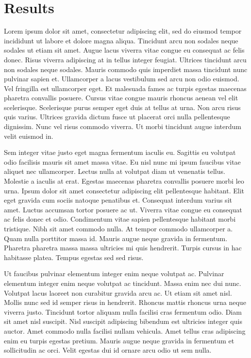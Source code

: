 \documentclass[
]{article}
\begin{document}
\hypertarget{results}{%
\section{Results}\label{results}}

Lorem ipsum dolor sit amet, consectetur adipiscing elit, sed do eiusmod tempor incididunt ut labore et dolore magna aliqua. Tincidunt arcu non sodales neque sodales ut etiam sit amet. Augue lacus viverra vitae congue eu consequat ac felis donec. Risus viverra adipiscing at in tellus integer feugiat. Ultrices tincidunt arcu non sodales neque sodales. Mauris commodo quis imperdiet massa tincidunt nunc pulvinar sapien et. Ullamcorper a lacus vestibulum sed arcu non odio euismod. Vel fringilla est ullamcorper eget. Et malesuada fames ac turpis egestas maecenas pharetra convallis posuere. Cursus vitae congue mauris rhoncus aenean vel elit scelerisque. Scelerisque purus semper eget duis at tellus at urna. Non arcu risus quis varius. Ultrices gravida dictum fusce ut placerat orci nulla pellentesque dignissim. Nunc vel risus commodo viverra. Ut morbi tincidunt augue interdum velit euismod in.

Sem integer vitae justo eget magna fermentum iaculis eu. Sagittis eu volutpat odio facilisis mauris sit amet massa vitae. Eu nisl nunc mi ipsum faucibus vitae aliquet nec ullamcorper. Lectus nulla at volutpat diam ut venenatis tellus. Molestie a iaculis at erat. Egestas maecenas pharetra convallis posuere morbi leo urna. Ipsum dolor sit amet consectetur adipiscing elit pellentesque habitant. Elit eget gravida cum sociis natoque penatibus et. Consequat interdum varius sit amet. Luctus accumsan tortor posuere ac ut. Viverra vitae congue eu consequat ac felis donec et odio. Condimentum vitae sapien pellentesque habitant morbi tristique. Nibh sit amet commodo nulla. At tempor commodo ullamcorper a. Quam nulla porttitor massa id. Mauris augue neque gravida in fermentum. Pharetra pharetra massa massa ultricies mi quis hendrerit. Turpis cursus in hac habitasse platea. Tempus egestas sed sed risus.

Ut faucibus pulvinar elementum integer enim neque volutpat ac. Pulvinar elementum integer enim neque volutpat ac tincidunt. Massa enim nec dui nunc. Volutpat lacus laoreet non curabitur gravida arcu ac. Ut etiam sit amet nisl. Mollis nunc sed id semper risus in hendrerit. Rhoncus mattis rhoncus urna neque viverra justo. Tincidunt tortor aliquam nulla facilisi cras fermentum odio. Diam sit amet nisl suscipit. Nisl suscipit adipiscing bibendum est ultricies integer quis auctor. Amet commodo nulla facilisi nullam vehicula. Amet tellus cras adipiscing enim eu turpis egestas pretium. Mauris augue neque gravida in fermentum et sollicitudin ac orci. Velit egestas dui id ornare arcu odio ut sem nulla.
\end{document}
